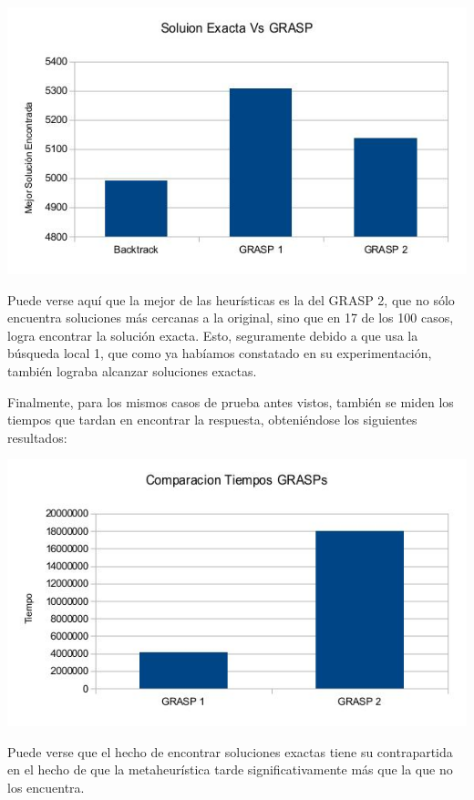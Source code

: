 \includegraphics[scale=0.5]{Ej5/graspSol.jpg}

Puede verse aquí que la mejor de las heurísticas es la del GRASP 2, que no sólo encuentra soluciones más cercanas a la original, sino que en 17 de los 100 casos, logra encontrar la solución exacta. Esto, seguramente debido a que usa la búsqueda local 1, que como ya habíamos constatado en su experimentación, también lograba alcanzar soluciones exactas.

Finalmente, para los mismos casos de prueba antes vistos, también se miden los tiempos que tardan en encontrar la respuesta, obteniéndose los siguientes resultados:

\includegraphics[scale=0.5]{Ej5/tiempos.jpg}

Puede verse que el hecho de encontrar soluciones exactas tiene su contrapartida en el hecho de que la metaheurística tarde significativamente más que la que no los encuentra.

